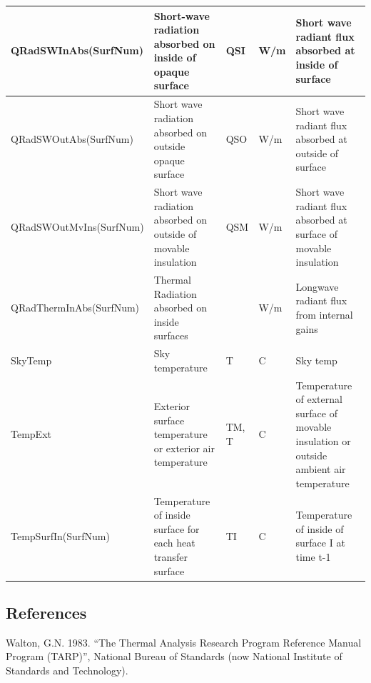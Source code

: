 {\begin{longtable}[c]{p{1.8in}p{1.2in}p{0.9in}p{0.9in}p{1.2in}}
QRadSWInAbs(SurfNum) & Short-wave radiation absorbed on inside of opaque surface & QSI & W/m & Short wave radiant flux absorbed at inside of surface \tabularnewline \midrule
QRadSWOutAbs(SurfNum) & Short wave radiation absorbed on outside opaque surface & QSO & W/m & Short wave radiant flux absorbed at outside of surface \tabularnewline \midrule
QRadSWOutMvIns(SurfNum) & Short wave radiation absorbed on outside of movable insulation & QSM & W/m & Short wave radiant flux absorbed at surface of movable insulation \tabularnewline \midrule
QRadThermInAbs(SurfNum) & Thermal Radiation absorbed on inside surfaces & ~ & W/m & Longwave radiant flux from internal gains \tabularnewline \midrule
SkyTemp & Sky temperature & T & C & Sky temp \tabularnewline \midrule
TempExt & Exterior surface temperature or exterior air temperature & TM, T & C & Temperature of external surface of movable insulation or outside ambient air temperature \tabularnewline \midrule
TempSurfIn(SurfNum) & Temperature of inside surface for each heat transfer surface & TI & C & Temperature of inside of surface I at time t-1 \tabularnewline
\bottomrule
\end{longtable}}

\subsection{References}\label{references-044}

Walton, G.N. 1983. ``The Thermal Analysis Research Program Reference Manual Program (TARP)'', National Bureau of Standards (now National Institute of Standards and Technology).
